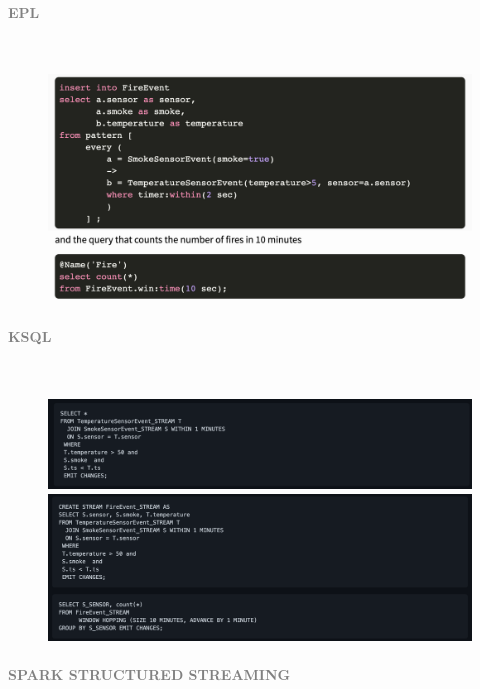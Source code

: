 \documentclass[10pt,a4paper]{article}
\newcommand{\myparagraph}[1]{\paragraph{\normalsize{\textcolor{gray}{\uppercase{\textbf{#1}}}} }\mbox{} \vspace{0.5em}\\}
\begin{document}
\myparagraph{EPL}
\begin{figure}[h!]
 \hfill \includegraphics[width=400pt]{images/epl_Q8}\hspace*{\fill}
\end{figure}
\myparagraph{KSQL}
\begin{figure}[h!]
 \hfill \includegraphics[width=400pt]{images/ksql_Q8}\hspace*{\fill}
 \\ \center
 \hfill \includegraphics[width=400pt]{images/ksql_Q9}\hspace*{\fill}
\end{figure}
\pagebreak
\myparagraph{Spark Structured Streaming}
\end{document}
